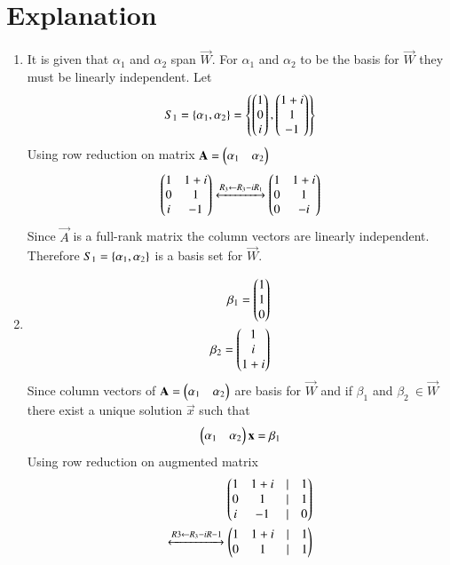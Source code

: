 \documentclass[journal,12pt,twocolumn]{IEEEtran}
\begin{document}
\section{Explanation}
\begin{enumerate}[label=\emph{\alph*)}]
\item 
It is given that $\alpha_1$ and $\alpha_2$ span $\vec{W}$. For $\alpha_1$ and
$\alpha_2$ to be the basis for $\vec{W}$ they must be linearly independent.
Let
\begin{align}
	S_1=\left\{\alpha_1,\alpha_2\right\}=\left\{\begin{pmatrix}1\\0\\i\end{pmatrix},\begin{pmatrix}1+i\\1\\-1\end{pmatrix}\right\}
\end{align}
Using row reduction on matrix $\mathbf{A}=\begin{pmatrix}\alpha_1 & \alpha_2\end{pmatrix}$
\begin{align}
	\myvec{1 & 1+i \\ 0 & 1 \\ i & -1}
	\xleftrightarrow[]{R_3 \leftarrow R_3-iR_1}
	\myvec{1 & 1+i \\ 0 & 1 \\ 0 & -i}   \label{rrefA}
\end{align}
Since $\vec{A}$ is a full-rank matrix the column vectors are linearly 
independent. Therefore $S_1= \left\{ \alpha_1, \alpha_2 \right\} $ is a basis set for 
$\vec{W}$.
\item
\begin{align}
	\beta_1=\begin{pmatrix}1\\1\\0\end{pmatrix} \\
	\beta_2=\begin{pmatrix}1\\i\\1+i\end{pmatrix} 
\end{align}
		Since column vectors of $\mathbf{A}=\begin{pmatrix}\alpha_1 & \alpha_2\end{pmatrix}$ are basis for $\vec{W}$ and if $\beta_1$ and $\beta_2 \ \in \vec{W}$ there exist a unique solution $\vec{x}$ such that
\begin{align}
	\begin{pmatrix}\alpha_1 & \alpha_2\end{pmatrix}\mathbf{x}=\beta_1 
\end{align}
Using row reduction on augmented matrix
		\begin{align}
			\begin{pmatrix}1 & 1+i & | & 1 \\
			       0 & 1   & | & 1 \\
			       i & -1  & | & 0\end{pmatrix}\\
			\xleftrightarrow[]{R3 \leftarrow R_3-iR-1}
			\begin{pmatrix}1 & 1+i & | & 1 \\
			       0 & 1   & | & 1 \\
\end{pmatrix}
\end{align}
\end{enumerate}
\end{document}
